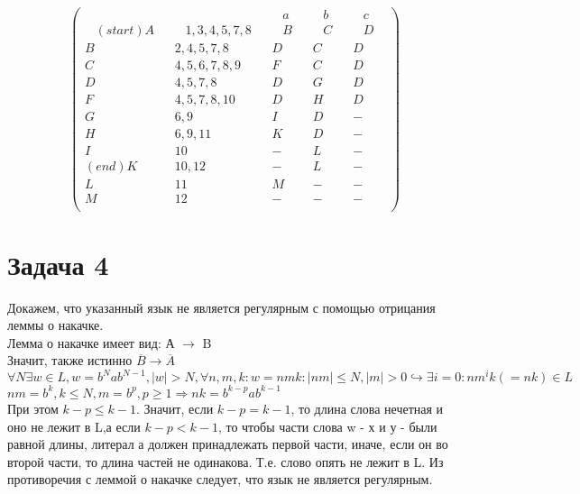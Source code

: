 \documentclass[a4paper,12pt]{article} %
\begin{document}
\[
\begin{pmatrix}
 \hspace{20pt}& \hspace{20pt}&\hspace{10pt}a\hspace{10pt}&\hspace{10pt}b\hspace{10pt}&\hspace{10pt}c\hspace{10pt}\\
 \hspace{10pt}(start)A\hspace{10pt} &\hspace{10pt} 1,3,4,5,7,8 \hspace{10pt}&\hspace{10pt}  B \hspace{10pt}& \hspace{10pt}C\hspace{10pt} &\hspace{10pt} D\hspace{10pt}\\
 B & 2,4,5,7,8 & D & C & D \\
 C & 4,5,6,7,8,9 & F & C & D \\
 D & 4,5,7,8 & D & G & D \\
 F & 4,5,7,8,10 & D & H & D\\
 G & 6,9 &  I & D & - \\
 H & 6,9,11 & K & D & - \\
 I & 10 & - & L & - \\
(end)K & 10,12 & - & L & - \\
 L &  11 & M & - & - \\ 
 M & 12 & - & - & -\\
\end{pmatrix}
\]


\section*{Задача 4}

Докажем, что указанный язык не является регулярным с помощью отрицания леммы о накачке.\\
Лемма о накачке имеет вид: А $\rightarrow $ B\\
Значит, также истинно $\overline{B}\rightarrow \overline{A}$\\

$\forall N \exists w \in L, w = b^Nab^{N-1},|w| > N, \forall n,m,k: w = nmk : |nm| \leq N, |m| > 0 \hookrightarrow \exists i = 0 : nm^ik (=nk) \in L$\\

$nm = b^k, k \leq N, m = b^p, p \geq 1 \Rightarrow nk = b^{k-p}ab^{k-1}$\\
При этом $ k-p \leq k-1$. Значит, если $ k-p = k-1$, то длина слова нечетная и оно не лежит в L,а если $ k-p < k-1$, то чтобы части слова w - х и у - были равной длины, литерал а должен принадлежать первой части, иначе, если он во второй части, то длина частей не одинакова. Т.е. слово опять не лежит в L. Из противоречия с леммой о накачке следует, что язык не является регулярным.\\    
\end{document}
